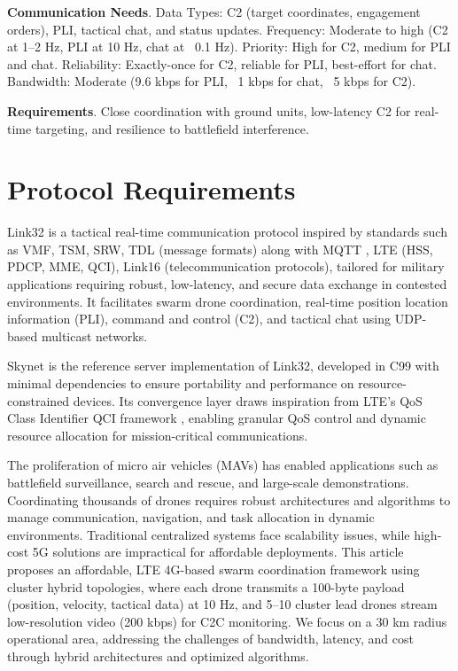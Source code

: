 \documentclass{article}
\begin{document}
\textbf{Communication Needs}.
Data Types: C2 (target coordinates, engagement orders), PLI, tactical chat, and status updates.
Frequency: Moderate to high (C2 at 1–2 Hz, PLI at 10 Hz, chat at ~0.1 Hz).
Priority: High for C2, medium for PLI and chat.
Reliability: Exactly-once for C2, reliable for PLI, best-effort for chat.
Bandwidth: Moderate (9.6 kbps for PLI, ~1 kbps for chat, ~5 kbps for C2).

\textbf{Requirements}.
Close coordination with ground units, low-latency C2 for real-time targeting,
and resilience to battlefield interference.

\newpage
\section{Protocol Requirements}
Link32 is a tactical real-time communication protocol inspired by standards such as
VMF, TSM, SRW, TDL \cite{tdl} (message formats) along with MQTT \cite{mqtt5},
LTE (HSS, PDCP, MME, QCI), Link16 \cite{link16std} (telecommunication protocols),
tailored for military applications requiring robust, low-latency, and secure data
exchange in contested environments. It facilitates swarm drone coordination,
real-time position location information (PLI), command and control (C2),
and tactical chat using UDP-based multicast networks.

Skynet is the reference server implementation of Link32, developed in C99 with minimal dependencies
to ensure portability and performance on resource-constrained devices. Its convergence layer draws
inspiration from LTE’s QoS Class Identifier QCI framework \cite{3gpp}, enabling granular QoS control and
dynamic resource allocation for mission-critical communications.

The proliferation of micro air vehicles (MAVs) has enabled applications
such as battlefield surveillance, search and rescue, and large-scale demonstrations.
Coordinating thousands of drones requires robust architectures and algorithms to
manage communication, navigation, and task allocation in dynamic environments.
Traditional centralized systems face scalability issues, while high-cost 5G
solutions are impractical for affordable deployments. This article proposes
an affordable, LTE 4G-based swarm coordination framework using cluster hybrid
topologies, where each drone transmits a 100-byte payload (position, velocity,
tactical data) at 10 Hz, and 5--10 cluster lead drones stream low-resolution
video (200 kbps) for C2C monitoring. We focus on a 30 km radius operational
area, addressing the challenges of bandwidth, latency, and cost through
hybrid architectures and optimized algorithms.
\end{document}
